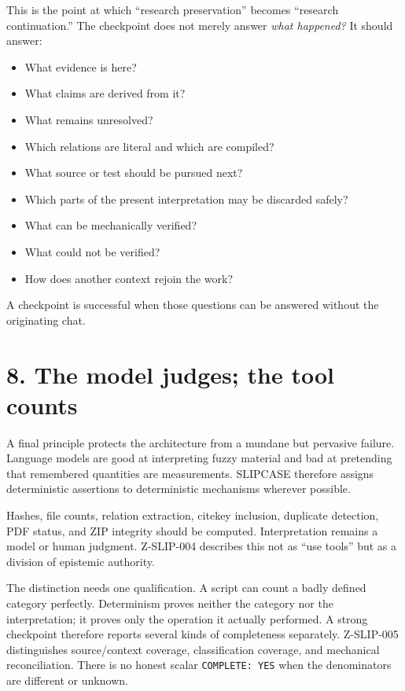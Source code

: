 \documentclass[
  11pt,
]{article}
\providecommand{\tightlist}{%
  \setlength{\itemsep}{0pt}\setlength{\parskip}{0pt}}
\begin{document}
This is the point at which ``research preservation'' becomes ``research
continuation.'' The checkpoint does not merely answer \emph{what
happened?} It should answer:

\begin{itemize}
\tightlist
\item
  What evidence is here?
\item
  What claims are derived from it?
\item
  What remains unresolved?
\item
  Which relations are literal and which are compiled?
\item
  What source or test should be pursued next?
\item
  Which parts of the present interpretation may be discarded safely?
\item
  What can be mechanically verified?
\item
  What could not be verified?
\item
  How does another context rejoin the work?
\end{itemize}

A checkpoint is successful when those questions can be answered without
the originating chat.

\section{8. The model judges; the tool
counts}\label{the-model-judges-the-tool-counts}

A final principle protects the architecture from a mundane but pervasive
failure. Language models are good at interpreting fuzzy material and bad
at pretending that remembered quantities are measurements. SLIPCASE
therefore assigns deterministic assertions to deterministic mechanisms
wherever possible.

Hashes, file counts, relation extraction, citekey inclusion, duplicate
detection, PDF status, and ZIP integrity should be computed.
Interpretation remains a model or human judgment. Z-SLIP-004 describes
this not as ``use tools'' but as a division of epistemic authority.

The distinction needs one qualification. A script can count a badly
defined category perfectly. Determinism proves neither the category nor
the interpretation; it proves only the operation it actually performed.
A strong checkpoint therefore reports several kinds of completeness
separately. Z-SLIP-005 distinguishes source/context coverage,
classification coverage, and mechanical reconciliation. There is no
honest scalar \texttt{COMPLETE:\ YES} when the denominators are
different or unknown.
\end{document}
